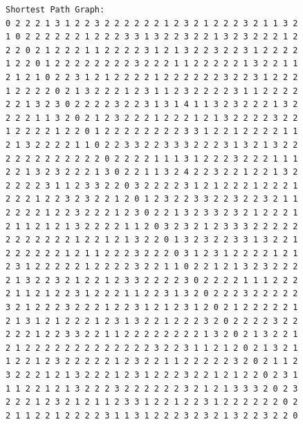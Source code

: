 \documentclass[11pt]{article}
\begin{document}
\begin{lstlisting}
Shortest Path Graph:
0 2 2 2 1 3 1 2 2 3 2 2 2 2 2 2 1 2 3 2 1 2 2 2 3 2 1 1 3 2
1 0 2 2 2 2 2 2 1 2 2 2 3 3 1 3 2 2 3 2 2 1 3 2 3 2 2 2 1 2
2 2 0 2 1 2 2 2 1 1 2 2 2 2 3 1 2 1 3 2 2 3 2 2 3 1 2 2 2 2
1 2 2 0 1 2 2 2 2 2 2 2 2 3 2 2 2 1 1 2 2 2 2 2 1 3 2 2 1 1
2 1 2 1 0 2 2 3 1 2 1 2 2 2 2 1 2 2 2 2 2 2 3 2 2 3 1 2 2 2
1 2 2 2 2 0 2 1 3 2 2 2 1 2 3 1 1 2 3 2 2 2 2 3 1 1 2 2 2 2
2 2 1 3 2 3 0 2 2 2 2 3 2 2 3 1 3 1 4 1 1 3 2 3 2 2 2 1 3 2
2 2 2 1 1 3 2 0 2 1 2 3 2 2 2 1 2 2 2 1 2 1 3 2 2 2 2 3 2 2
1 2 2 2 2 1 2 2 0 1 2 2 2 2 2 2 2 2 3 3 1 2 2 1 2 2 2 2 1 1
2 1 3 2 2 2 2 1 1 0 2 2 3 3 2 2 3 3 3 2 2 2 3 1 3 2 1 3 2 2
2 2 2 2 2 2 2 2 2 2 0 2 2 2 2 1 1 1 3 1 2 2 2 3 2 2 2 1 1 1
2 2 1 3 2 3 2 2 2 1 3 0 2 2 1 1 3 2 4 2 2 3 2 2 1 2 2 1 3 2
2 2 2 2 3 1 1 2 3 3 2 2 0 3 2 2 2 2 3 1 2 1 2 2 2 1 2 2 2 1
2 2 2 1 2 2 3 2 3 2 2 1 2 0 1 2 3 2 2 3 3 2 2 3 2 2 3 2 1 1
2 2 2 2 1 2 2 3 2 2 2 1 2 3 0 2 2 1 3 2 3 3 2 3 2 1 2 2 2 1
2 1 1 2 1 2 1 3 2 2 2 2 1 1 2 0 3 2 3 2 1 2 3 3 3 2 2 2 2 2
2 2 2 2 2 2 2 1 2 2 1 2 1 3 2 2 0 1 3 2 3 2 2 3 3 1 3 2 2 1
2 2 2 2 2 2 1 2 1 1 2 2 2 3 2 2 2 0 3 1 2 3 1 2 2 2 2 1 2 1
2 3 1 2 2 2 2 2 1 2 2 2 2 3 2 2 1 1 0 2 2 1 2 1 3 2 3 2 2 2
2 1 3 2 2 3 2 1 2 2 1 2 3 3 2 2 2 2 3 0 2 2 2 2 1 1 1 2 2 2
2 1 1 2 1 2 2 3 1 2 2 2 1 1 2 2 3 1 3 2 0 2 2 2 3 2 2 2 2 2
3 2 1 2 2 2 3 2 2 2 1 2 2 3 1 2 1 2 3 1 2 0 2 1 2 2 2 2 2 1
2 1 3 1 2 1 2 2 2 1 2 3 1 3 2 2 1 2 2 2 3 2 0 2 2 2 2 3 2 2
2 2 2 1 2 2 3 3 2 2 1 1 2 2 2 2 2 2 2 2 1 3 2 0 2 1 3 2 2 1
2 1 2 2 2 2 2 2 2 2 2 2 2 2 2 3 2 2 3 1 1 2 1 2 0 2 1 3 2 1
1 2 2 1 2 3 2 2 2 2 2 1 2 3 2 2 1 1 2 2 2 2 2 3 2 0 2 1 1 2
3 2 2 2 1 2 1 3 2 2 2 1 2 3 1 2 2 2 3 2 2 1 2 1 2 2 0 2 3 1
1 1 2 2 1 2 1 3 2 2 2 3 2 2 2 2 2 2 3 2 1 2 1 3 3 3 2 0 2 3
2 2 2 1 2 3 2 1 2 1 1 2 3 3 1 2 2 1 2 2 3 1 2 2 2 2 2 2 0 2
2 1 1 2 2 1 2 2 2 2 3 1 1 3 1 2 2 2 3 2 3 2 1 3 2 2 3 2 2 0


\end{lstlisting}
\end{document}
